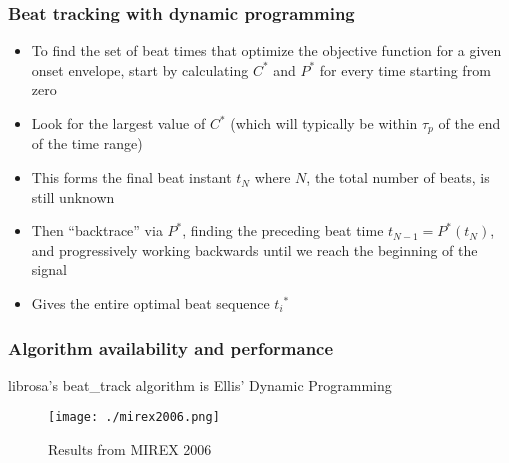 \documentclass{beamer}
\begin{document}
\begin{frame}
	\frametitle{Beat tracking with dynamic programming}
	\begin{itemize}
		\item
			To find the set of beat times that optimize the objective function for a given onset envelope, start by calculating $C^{*}$ and $P^{*}$ for every time starting from zero
		\item
			Look for the largest value of $C^{*}$ (which will typically be within $\tau_{p}$ of the end of the time range)
		\item
			This forms the final beat instant $t_{N}$ where $N$, the total number of beats, is still unknown
		\item
			Then ``backtrace'' via $P^{*}$, finding the preceding beat time $t_{N-1} = P^{*}(t_{N})$,  and  progressively working backwards until we reach the beginning of the signal
		\item
			Gives the entire optimal beat sequence ${t_{i}}^{*}$
	\end{itemize}
\end{frame}



\begin{frame}
	\frametitle{Algorithm availability and performance}
	librosa's beat\_track algorithm is Ellis' Dynamic Programming\\
	\begin{figure}
		\texttt{[image: ./mirex2006.png]}
		\caption{Results from MIREX 2006}
	\end{figure}
\end{frame}
\end{document}
